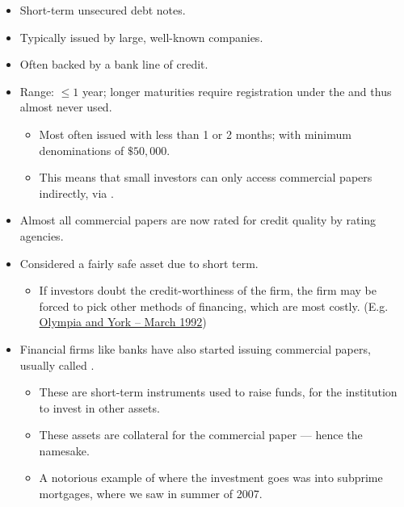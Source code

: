 \documentclass[notoc,notitlepage]{tufte-book}
\begin{document}
\begin{itemize}
  \item Short-term unsecured debt notes.
  \item Typically issued by large, well-known companies.
  \item Often backed by a bank line of credit.
  \item Range: $\leq 1$ year; longer maturities require registration under
    the  and thus almost never used.
    \begin{itemize}
      \item Most often issued with less than 1 or 2 months;
        with minimum denominations of $\$50,000$.
      \item This means that small investors can only access commercial papers
        indirectly, via .
    \end{itemize}
  \item Almost all commercial papers are now rated for credit quality
    by rating agencies.
  \item Considered a fairly safe asset due to short term.
    \begin{itemize}
      \item If investors doubt the credit-worthiness of the firm,
        the firm may be forced to pick other methods of financing,
        which are most costly. (E.g.
        \href{https://en.wikipedia.org/wiki/Olympia_and_York}{Olympia and York
        -- March 1992})
    \end{itemize}
  \item Financial firms like banks have also started issuing commercial papers,
    usually called .
    \begin{itemize}
      \item These are short-term instruments used to raise funds,
        for the institution to invest in other assets.
      \item These assets are collateral for the commercial paper --- hence
        the namesake.
      \item A notorious example of where the investment goes was into subprime
        mortgages, where we saw in summer of 2007.
    \end{itemize}
\end{itemize}
\end{document}
